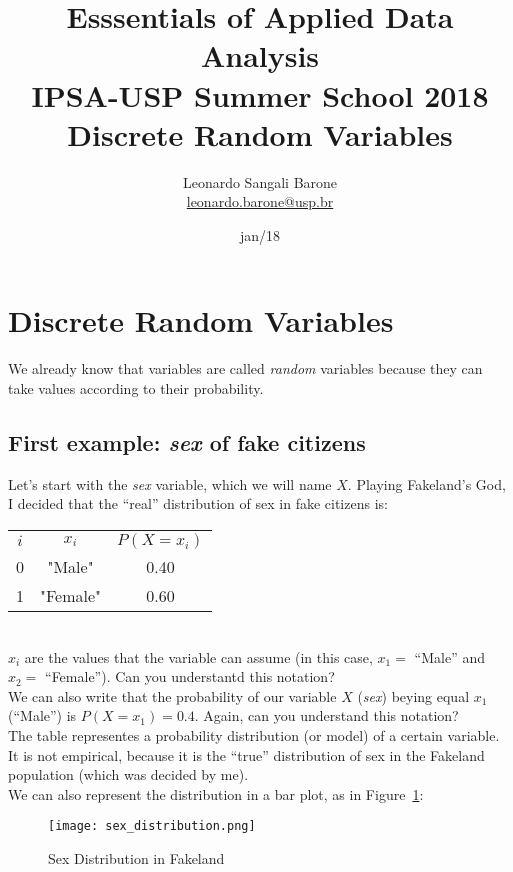 \documentclass[11pt]{article}
\title{\textbf{Esssentials of Applied Data Analysis\\
				IPSA-USP Summer School 2018}\newline\\
				Discrete Random Variables}
\author{Leonardo Sangali Barone\\ \href{leonardo.barone@usp.br}{leonardo.barone@usp.br}}
\date{jan/18}
\begin{document}
\maketitle

\section*{Discrete Random Variables}

	We already know that variables are called \emph{random} variables because they can take values according to their probability.\\
	
	\subsection*{First example: \emph{sex} of fake citizens}
	
	Let's start with the \emph{sex} variable, which we will name $X$. Playing Fakeland's God, I decided that the ``real'' distribution of sex in fake citizens is:\\
	
\begin{tabular}{|c|c|c|}
\hline
	$i$ & $x_i$ & $P(X=x_i)$\\
	\cline{1-3}
	0 & "Male" & 0.40\\
	1 & "Female" & 0.60\\
\hline
\end{tabular}\\

$x_i$ are the values that the variable can assume (in this case, $x_1 = $ ``Male'' and $x_2 = $ ``Female''). Can you understantd this notation?\\

We can also write that the probability of our variable $X$ (\emph{sex}) beying equal $x_1$ (``Male'') is $P(X = x_1) = 0.4$. Again, can you understand this notation?\\

The table representes a probability distribution (or model) of a certain variable. It is not empirical, because it is the ``true'' distribution of sex in the Fakeland population (which was decided by me).\\

We can also represent the distribution in a bar plot, as in Figure~\ref{f1}:

\begin{figure}[htp]
\centering
\texttt{[image: sex\_distribution.png]}
\caption{Sex Distribution in Fakeland}
\label{f1}
\end{figure}
\end{document}
